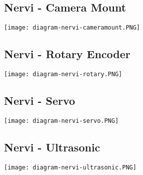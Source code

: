 \subsection{Nervi - Camera Mount}
\texttt{[image: diagram-nervi-cameramount.PNG]}

\subsection{Nervi - Rotary Encoder}
\texttt{[image: diagram-nervi-rotary.PNG]}

\subsection{Nervi - Servo}
\texttt{[image: diagram-nervi-servo.PNG]}

\subsection{Nervi - Ultrasonic}
\texttt{[image: diagram-nervi-ultrasonic.PNG]}

